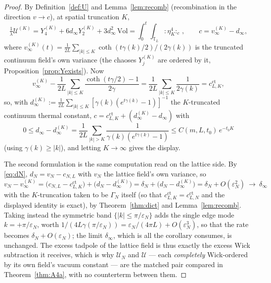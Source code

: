 \documentclass[11pt,a4paper]{article}
\theoremstyle{plain}
\theoremstyle{definition}
\newcommand{\T}{\mathbb{T}}
\newcommand{\eps}{\varepsilon}
\newcommand{\U}{\mathcal U}
\DeclareMathOperator{\cth}{coth}
\begin{document}
\begin{proof}
By Definition~\ref{def:U} and Lemma~\ref{lem:recomb} (recombination in the
direction $v\to c$), at spatial truncation $K$,
\[
 \tfrac1\lambda\U^{(K)}
 =Y^{(K)}_4+6d_\infty Y^{(K)}_2+3d_\infty^2\,\mathrm{Vol}
 =\int_0^t\!\!\int_{\T_L}{:}\eta_K^4{:}_{c}\,,
 \qquad c=v^{(K)}_\infty-d_\infty ,
\]
where $v^{(K)}_\infty(t)=\tfrac1{2L}\sum_{|k|\le K}
\cth(t\gamma(k)/2)/(2\gamma(k))$ is the truncated continuum field's own
variance (the chaoses $Y^{(K)}_j$ are ordered by it,
Proposition~\ref{prop:Yexists}). Now
\[
 v^{(K)}_\infty-\frac1{2L}\!\sum_{|k|\le K}\!\frac{\cth(t\gamma/2)-1}{2\gamma}
 =\frac1{2L}\sum_{|k|\le K}\frac1{2\gamma(k)}
 =c^{\mathrm{ct}}_{L,K},
\]
so, with
$d^{(K)}_\infty:=\tfrac1{2L}\sum_{|k|\le K}
[\gamma(k)(e^{t\gamma(k)}-1)]^{-1}$ the $K$-truncated continuum thermal
constant, $c=c^{\mathrm{ct}}_{L,K}+(d^{(K)}_\infty-d_\infty)$ with
\[
 0\le d_\infty-d^{(K)}_\infty
 =\frac1{2L}\sum_{|k|>K}\frac1{\gamma(k)(e^{t\gamma(k)}-1)}
 \le C(m,L,t_0)\,e^{-t_0K}
\]
(using $\gamma(k)\ge|k|$), and letting $K\to\infty$ gives the display.

The second formulation is the same computation read on the lattice side. By
\eqref{eq:dN}, $d_N=v_N-c_{N,L}$ with $v_N$ the lattice field's own variance,
so
\[
 v_N-v^{(K)}_\infty
 =\bigl(c_{N,L}-c^{\mathrm{ct}}_{L,K}\bigr)+\bigl(d_N-d^{(K)}_\infty\bigr)
 =\delta_N+\bigl(d_N-d^{(K)}_\infty\bigr)=\delta_N+O(\eps_N^2)
 \ \longrightarrow\ \delta_\infty
\]
with the $K$-truncation taken to be $\Gamma_N$ itself (so that
$c^{\mathrm{ct}}_{L,K}=c^{\mathrm{ct}}_{L,N}$ and the displayed identity is
exact), by Theorem~\ref{thm:dict} and Lemma~\ref{lem:recomb}. Taking instead
the symmetric band $\{|k|\le\pi/\eps_N\}$ adds the single edge mode
$k=+\pi/\eps_N$, worth $1/(4L\gamma(\pi/\eps_N))=\eps_N/(4\pi L)+O(\eps_N^3)$,
so that the rate becomes $\delta_N+O(\eps_N)$; the limit $\delta_\infty$,
which is all the corollary consumes, is unchanged. The
excess tadpole of the lattice field is thus exactly the excess Wick
subtraction it receives, which is why $\U_N$ and $\U$ --- each
\emph{completely} Wick-ordered by its own field's vacuum constant --- are the
matched pair compared in Theorem~\ref{thm:A4a}, with no counterterm between
them.
\end{proof}
\end{document}
